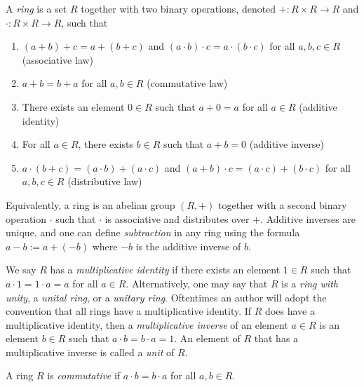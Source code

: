\documentclass[12pt]{article}
\begin{document}
A \emph{ring} is a set $R$ together with two binary operations, denoted $+: R \times R \longrightarrow R$ and $\cdot: R \times R \longrightarrow R$, such that
\begin{enumerate}
\item $(a+b)+c = a+(b+c)$ and $(a \cdot b) \cdot c = a \cdot (b \cdot c)$ for all $a,b,c \in R$ (associative law)
\item $a+b = b+a$ for all $a,b \in R$ (commutative law)
\item There exists an element $0 \in R$ such that $a+0 = a$ for all $a \in R$ (additive identity)
\item For all $a \in R$, there exists $b \in R$ such that $a+b = 0$ (additive inverse)
\item $a\cdot(b+c) = (a \cdot b) + (a \cdot c)$ and $(a+b) \cdot c = (a \cdot c) + (b \cdot c)$ for all $a,b,c \in R$ (distributive law)
\end{enumerate}
Equivalently, a ring is an abelian group $(R,+)$ together with a second binary operation $\cdot$ such that $\cdot$ is associative and distributes over $+$. Additive inverses are unique, and one can define \emph{subtraction} in any ring using the formula $a-b := a + (-b)$ where $-b$ is the additive inverse of $b$.

We say $R$ has a \emph{multiplicative identity} if there exists an element $1 \in R$ such that $a \cdot 1 = 1 \cdot a = a$ for all $a \in R$. Alternatively, one may say that $R$ is a \emph{ring with unity}, a \emph{unital ring}, or a \emph{unitary ring}. Oftentimes an author will adopt the convention that all rings have a multiplicative identity. If $R$ does have a multiplicative identity, then a \emph{multiplicative inverse} of an element $a \in R$ is an element $b \in R$ such that $a \cdot b = b \cdot a = 1$. An element of $R$ that has a multiplicative inverse is called a \emph{unit} of $R$.

A ring $R$ is \emph{commutative} if $a \cdot b = b \cdot a$ for all $a,b \in R$.


\end{document}
